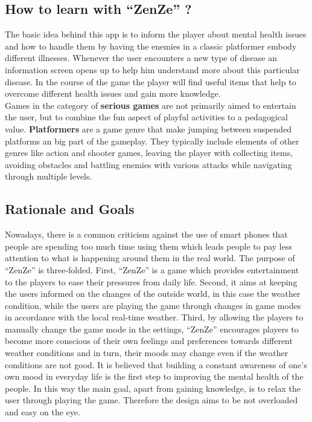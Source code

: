 \documentclass{sigchi}
\begin{document}
\subsection{How to learn with ``ZenZe'' ?}

The basic idea behind this app is to inform the player about mental health issues and how to handle them by having the enemies in a classic platformer embody different illnesses. Whenever the user encounters a new type of disease an information screen opens up to help him understand more about this particular disease. In the course of the game the player will find useful items that help to overcome different health issues and gain more knowledge.\\
Games in the category of \textbf{serious games} are not primarily aimed to entertain the user, but to combine the fun aspect of playful activities to a pedagogical value.
\textbf{Platformers} are a game genre that make jumping between suspended platforms an big part of the gameplay. They typically include elements of other genres like action and shooter games, leaving the player with collecting items, avoiding obstacles and battling enemies with various attacks while navigating through multiple levels.

\subsection{Rationale and Goals}
Nowadays, there is a common criticism against the use of smart phones that people are spending too much time using them which leads people to pay less attention to what is happening around them in the real world. The purpose of ``ZenZe'' is three-folded. First, ``ZenZe'' is a game which provides entertainment to the players to ease their pressures from daily life. Second, it aims at keeping the users informed on the changes of the outside world, in this case the weather condition, while the users are playing the game through changes in game modes in accordance with the local real-time weather. Third, by allowing the players to manually change the game mode in the settings, ``ZenZe'' encourages players to become more conscious of their own feelings and preferences towards different weather conditions and in turn, their moods may change even if the weather conditions are not good. It is believed that building a constant awareness of one's own mood in everyday life is the first step to improving the mental health of the people. In this way the main goal, apart from gaining knowledge, is to relax the user through playing the game. Therefore the design aims to be not overloaded and easy on the eye.
\end{document}
